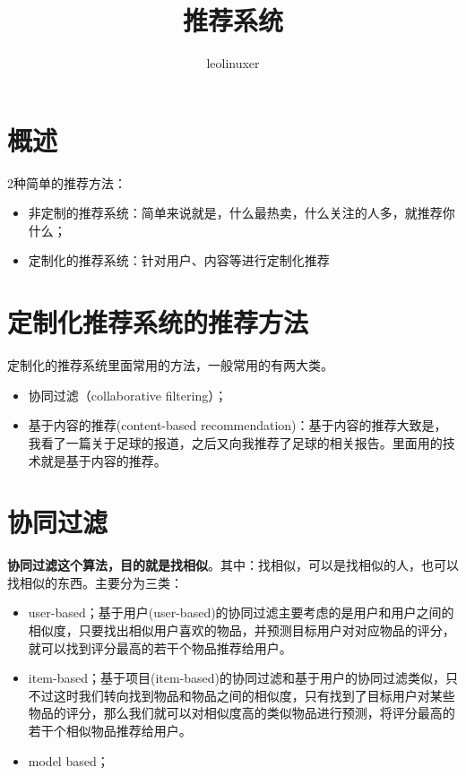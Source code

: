 \documentclass[12pt]{article}
\title{推荐系统\cite{Reference_System_In_8_Mins}\cite{Collaborative_Filtering_Algorithms_Overview}}
\author{leolinuxer}
\begin{document}
\maketitle
\tableofcontents

\section{概述}
2种简单的推荐方法：
\begin{itemize}
\setlength{\itemsep}{0pt}
\setlength{\parsep}{0pt}
\setlength{\parskip}{0pt}
    \item 非定制的推荐系统：简单来说就是，什么最热卖，什么关注的人多，就推荐你什么；
    \item 定制化的推荐系统：针对用户、内容等进行定制化推荐
\end{itemize}


\section{定制化推荐系统的推荐方法}
定制化的推荐系统里面常用的方法，一般常用的有两大类。
\begin{itemize}
\setlength{\itemsep}{0pt}
\setlength{\parsep}{0pt}
\setlength{\parskip}{0pt}
    \item 协同过滤（collaborative filtering）；
    \item 基于内容的推荐(content-based recommendation)：基于内容的推荐大致是，我看了一篇关于足球的报道，之后又向我推荐了足球的相关报告。里面用的技术就是基于内容的推荐。
\end{itemize}

\section{协同过滤}
\textbf{协同过滤这个算法，目的就是找相似}。其中：找相似，可以是找相似的人，也可以找相似的东西。主要分为三类：
\begin{itemize}
\setlength{\itemsep}{0pt}
\setlength{\parsep}{0pt}
\setlength{\parskip}{0pt}
    \item user-based；基于用户(user-based)的协同过滤主要考虑的是用户和用户之间的相似度，只要找出相似用户喜欢的物品，并预测目标用户对对应物品的评分，就可以找到评分最高的若干个物品推荐给用户。
    \item item-based；基于项目(item-based)的协同过滤和基于用户的协同过滤类似，只不过这时我们转向找到物品和物品之间的相似度，只有找到了目标用户对某些物品的评分，那么我们就可以对相似度高的类似物品进行预测，将评分最高的若干个相似物品推荐给用户。
    \item model based；
\end{itemize}
\end{document}
